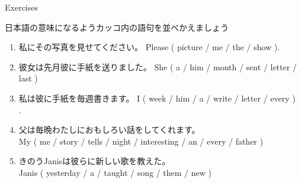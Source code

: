 \documentclass[aspectratio=169,xcolor={dvipsnames,table}]{beamer}
\begin{document}
\begin{frame}[plain]{Exercises}{}

{\small 日本語の意味になるようカッコ内の語句を並べかえましょう}
 \hfill{\scriptsize {}}


\begin{enumerate}
 \item {\small 私にその写真を見せてください。}  Please ( picture / me  / the / show ). \\
 \item {\small 彼女は先月彼に手紙を送りました。}
She ( a / him / month / sent / letter / last )\\
 \item {\small 私は彼に手紙を毎週書きます。} I ( week / him / a / write / letter / every )\\
.
 \item {\small 父は毎晩わたしにおもしろい話をしてくれます。}\\
My ( me / story / tells / night / interesting / an / every / father )\\
 \item {\small きのうJanisは彼らに新しい歌を教えた}。\\
Janis ( yesterday / a / taught / song / them / new )\\
\end{enumerate}

\end{frame}
\end{document}
